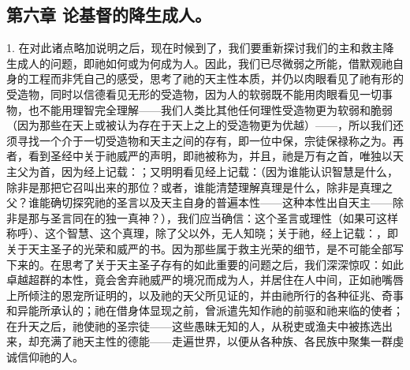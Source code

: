 
\subsection{第六章 论基督的降生成人。}

1. 在对此诸点略加说明之后，现在时候到了，我们要重新探讨我们的主和救主降生成人的问题，即祂如何或为何成为人。因此，我们已尽微弱之所能，借默观祂自身的工程而非凭自己的感受，思考了祂的天主性本质，并仍以肉眼看见了祂有形的受造物，同时以信德看见无形的受造物，因为人的软弱既不能用肉眼看见一切事物，也不能用理智完全理解——我们人类比其他任何理性受造物更为软弱和脆弱（因为那些在天上或被认为存在于天上之上的受造物更为优越）——，所以我们还须寻找一个介于一切受造物和天主之间的存有，即一位中保，宗徒保禄称之为。再者，看到圣经中关于祂威严的声明，即祂被称为，并且，祂是万有之首，唯独以天主父为首，因为经上记载：；又明明看见经上记载：（因为谁能认识智慧是什么，除非是那把它召叫出来的那位？或者，谁能清楚理解真理是什么，除非是真理之父？谁能确切探究祂的圣言以及天主自身的普遍本性——这种本性出自天主——除非是那与圣言同在的独一真神？），我们应当确信：这个圣言或理性（如果可这样称呼）、这个智慧、这个真理，除了父以外，无人知晓；关于祂，经上记载：，即关于天主圣子的光荣和威严的书。因为那些属于救主光荣的细节，是不可能全部写下来的。在思考了关于天主圣子存有的如此重要的问题之后，我们深深惊叹：如此卓越超群的本性，竟会舍弃祂威严的境况而成为人，并居住在人中间，正如祂嘴唇上所倾注的恩宠所证明的，以及祂的天父所见证的，并由祂所行的各种征兆、奇事和异能所承认的；祂在借身体显现之前，曾派遣先知作祂的前驱和祂来临的使者；在升天之后，祂使祂的圣宗徒——这些愚昧无知的人，从税吏或渔夫中被拣选出来，却充满了祂天主性的德能——走遍世界，以便从各种族、各民族中聚集一群虔诚信仰祂的人。\par

